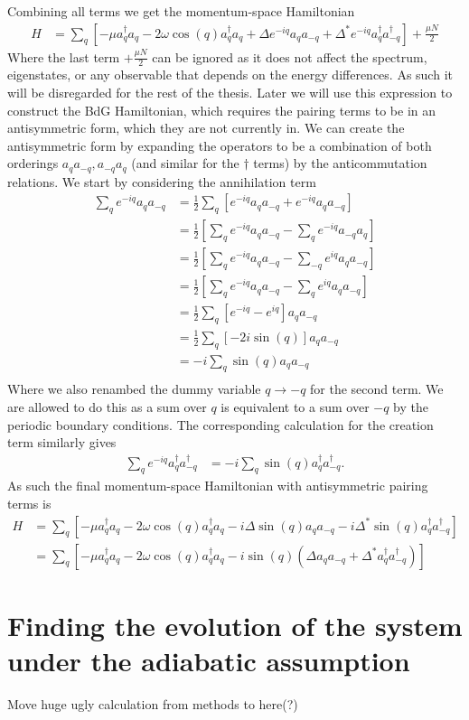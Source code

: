 Combining all terms we get the momentum-space Hamiltonian
\begin{align}
    H &= \sum_q \left[ -\mu a_q^\dagger a_q  - 2\omega \cos(q)a_q^\dagger a_q + \Delta e^{-iq} a_q a_{-q} + \Delta^* e^{-iq} a_q^\dagger a_{-q}^\dagger \right] + \frac{\mu N}{2}
\end{align}
Where the last term $+ \frac{\mu N}{2}$ can be ignored as it does not affect the spectrum, eigenstates, or any observable that depends on the energy differences. As such it will be disregarded for the rest of the thesis. Later we will use this expression to construct the BdG Hamiltonian, which requires the pairing terms to be in an antisymmetric form, which they are not currently in. We can create the antisymmetric form by expanding the operators to be a combination of both orderings $a_q a_{-q}, a_{-q} a_q$ (and similar for the $\dagger$ terms) by the anticommutation relations. We start by considering the annihilation term 
\begin{align}
    \sum_q e^{-iq} a_q a_{-q} &= \frac{1}{2} \sum_q \left[e^{-iq} a_q a_{-q} + e^{-iq} a_q a_{-q} \right] \\
    &= \frac{1}{2} \left[\sum_q e^{-iq} a_q a_{-q} - \sum_q e^{-iq} a_{-q} a_{q} \right] \\
    &= \frac{1}{2} \left[\sum_q e^{-iq} a_q a_{-q} - \sum_{-q} e^{iq} a_{q} a_{-q} \right] \\
    &= \frac{1}{2} \left[\sum_q e^{-iq} a_q a_{-q} - \sum_{q} e^{iq} a_{q} a_{-q} \right] \\
    &= \frac{1}{2} \sum_q \left[e^{-iq} - e^{iq} \right] a_q a_{-q} \\
    &=\frac{1}{2} \sum_q \left[- 2 i \sin(q) \right] a_q a_{-q} \\
    &= - i \sum_q \sin(q) a_q a_{-q} \\
\end{align}
Where we also renambed the dummy variable $q \to -q$ for the second term. We are allowed to do this as a sum over $q$ is equivalent to a sum over $-q$ by the periodic boundary conditions. The corresponding calculation for the creation term similarly gives
\begin{align}
    \sum_q e^{-iq} a_q^\dagger a_{-q}^\dagger &= -i \sum_q \sin(q) a_q^\dagger a_{-q}^\dagger.
\end{align}
As such the final momentum-space Hamiltonian with antisymmetric pairing terms is
\begin{align}
    H &= \sum_q \left[-\mu a_q^\dagger a_q - 2 \omega \cos(q) a_q^\dagger a_q  - i \Delta \sin(q) a_q a_{-q} - i \Delta^* \sin(q) a_q^\dagger a_{-q}^\dagger \right]\\
    &= \sum_q \left[-\mu a_q^\dagger a_q - 2 \omega \cos(q) a_q^\dagger a_q  - i \sin(q) \left( \Delta a_q a_{-q} + \Delta^* a_q^\dagger a_{-q}^\dagger\right) \right]
\end{align}

\section{Finding the evolution of the system under the adiabatic assumption}
\label{Appendix:Finding_Adiabatic_evolution_equation}

Move huge ugly calculation from methods to here(?)